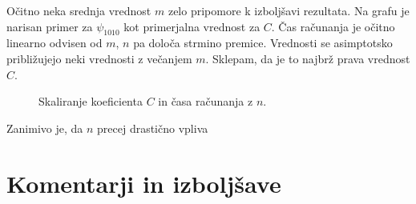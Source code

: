 \documentclass[a4paper]{article}
\begin{document}
Očitno neka srednja vrednost $m$ zelo pripomore k izboljšavi rezultata. Na grafu je narisan primer za $\psi_{1010}$ kot primerjalna vrednost
za $C$. Čas računanja je očitno linearno odvisen od $m$, $n$ pa določa strmino premice. Vrednosti se asimptotsko približujejo neki vrednosti
z večanjem $m$. Sklepam, da je to najbrž prava vrednost $C$.

\begin{figure}[H]
    \centering
    \caption{Skaliranje koeficienta $C$ in časa računanja z $n$.}
\end{figure}

Zanimivo je, da $n$ precej drastično vpliva 


\section{Komentarji in izboljšave}


\newpage


\end{document}

